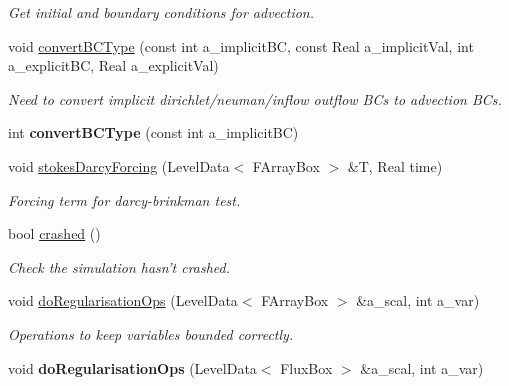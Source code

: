 \begin{DoxyCompactItemize}
\begin{DoxyCompactList}\small\item\em Get initial and boundary conditions for advection. \end{DoxyCompactList}\item 
\hypertarget{class_a_m_r_level_mushy_layer_af343ac4563d008066f072fee73d8dc0e}{void \hyperlink{class_a_m_r_level_mushy_layer_af343ac4563d008066f072fee73d8dc0e}{convert\-B\-C\-Type} (const int a\-\_\-implicit\-B\-C, const Real a\-\_\-implicit\-Val, int a\-\_\-explicit\-B\-C, Real a\-\_\-explicit\-Val)}\label{class_a_m_r_level_mushy_layer_af343ac4563d008066f072fee73d8dc0e}

\begin{DoxyCompactList}\small\item\em Need to convert implicit dirichlet/neuman/inflow outflow B\-Cs to advection B\-Cs. \end{DoxyCompactList}\item 
\hypertarget{class_a_m_r_level_mushy_layer_aae8bd0481accd53b1662d44ddf27eb33}{int {\bfseries convert\-B\-C\-Type} (const int a\-\_\-implicit\-B\-C)}\label{class_a_m_r_level_mushy_layer_aae8bd0481accd53b1662d44ddf27eb33}

\item 
\hypertarget{class_a_m_r_level_mushy_layer_a4cb7430dbeb587992f88b45d9b26ad64}{void \hyperlink{class_a_m_r_level_mushy_layer_a4cb7430dbeb587992f88b45d9b26ad64}{stokes\-Darcy\-Forcing} (Level\-Data$<$ F\-Array\-Box $>$ \&T, Real time)}\label{class_a_m_r_level_mushy_layer_a4cb7430dbeb587992f88b45d9b26ad64}

\begin{DoxyCompactList}\small\item\em Forcing term for darcy-\/brinkman test. \end{DoxyCompactList}\item 
\hypertarget{class_a_m_r_level_mushy_layer_a38a4a2391d1667f06f8f003afb3dba12}{bool \hyperlink{class_a_m_r_level_mushy_layer_a38a4a2391d1667f06f8f003afb3dba12}{crashed} ()}\label{class_a_m_r_level_mushy_layer_a38a4a2391d1667f06f8f003afb3dba12}

\begin{DoxyCompactList}\small\item\em Check the simulation hasn't crashed. \end{DoxyCompactList}\item 
void \hyperlink{class_a_m_r_level_mushy_layer_a508d3f7f8099dbaacfdaefe36d064e57}{do\-Regularisation\-Ops} (Level\-Data$<$ F\-Array\-Box $>$ \&a\-\_\-scal, int a\-\_\-var)
\begin{DoxyCompactList}\small\item\em Operations to keep variables bounded correctly. \end{DoxyCompactList}\item 
\hypertarget{class_a_m_r_level_mushy_layer_af2fd1f6837f1ee9f5eb1bdc50773d029}{void {\bfseries do\-Regularisation\-Ops} (Level\-Data$<$ Flux\-Box $>$ \&a\-\_\-scal, int a\-\_\-var)}\label{class_a_m_r_level_mushy_layer_af2fd1f6837f1ee9f5eb1bdc50773d029}


\end{DoxyCompactItemize}
